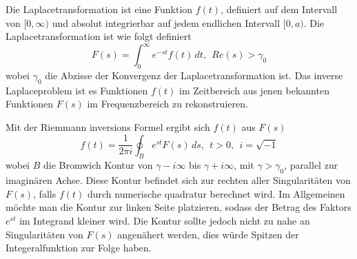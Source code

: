 %
%
%
Die Laplacetransformation ist eine Funktion $f(t)$, definiert auf dem Intervall von $[0, \infty)$ und absolut integrierbar auf jedem endlichen Intervall $[0, a)$. 
Die Laplacetransformation ist wie folgt definiert
\[
F(s) = \int_0^\infty e^{-st}f(t)\,dt,~~Re(s)>\gamma_{0}
\]
wobei $\gamma_{0}$ die Abzisse der Konvergenz der Laplacetransformation ist. 
Das inverse Laplaceproblem ist es Funktionen $f(t)$ im Zeitbereich aus jenen bekannten Funktionen $F(s)$ im Frequenzbereich zu rekonstruieren.

Mit der Riemmann inversions Formel ergibt sich $f(t)$ aus $F(s)$
\[
f(t) = \frac{1}{2\pi i} \oint_{B} e^{st}F(s)\,ds,~~t>0,~~i=\sqrt{-1}
\]
wobei $B$ die Bromwich Kontur von $\gamma-i\infty$ bis $\gamma+i\infty$, mit $\gamma>\gamma_{0}$, parallel zur imaginären Achse.
Diese Kontur befindet sich zur rechten aller Singularitäten von $F(s)$, falls $f(t)$ durch numerische quadratur berechnet wird.
Im Allgemeinen möchte man die Kontur zur linken Seite platzieren, sodass der Betrag des Faktors $e^{st}$ im Integrand kleiner wird.
Die Kontur sollte jedoch nicht zu nahe an Singularitäten von $F(s)$ angenähert werden, dies würde Spitzen der Integeralfunktion zur Folge haben.

